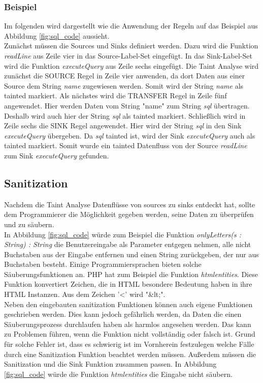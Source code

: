 \documentclass[runningheads]{llncs}
\begin{document}
\subsubsection{Beispiel}
Im folgenden wird dargestellt wie die Anwendung der Regeln auf das Beispiel aus Abbildung \ref{fig:sql_code} aussieht. 
\\Zunächst müssen die Sources und Sinks definiert werden. Dazu wird die Funktion \emph{readLine} aus Zeile vier in das Source-Label-Set eingefügt. In das Sink-Label-Set wird die Funktion \emph{executeQuery} aus Zeile sechs eingefügt. Die Taint Analyse wird zunächst die SOURCE Regel in Zeile vier anwenden, da dort Daten aus einer Source dem String \emph{name} zugewiesen werden. Somit wird der String \emph{name} als tainted markiert. Als nächstes wird die TRANSFER Regel in Zeile fünf angewendet. Hier werden Daten vom String "name" zum String \emph{sql} übertragen. Deshalb wird auch hier der String \emph{sql} als tainted markiert. Schließlich wird in Zeile sechs die SINK Regel angewendet. Hier wird der String \emph{sql} in den Sink \emph{executeQuery} übergeben. Da \emph{sql} tainted ist, wird der Sink \emph{executeQuery} auch als tainted markiert. Somit wurde ein tainted Datenfluss von der Source \emph{readLine} zum Sink \emph{executeQuery} gefunden.

\subsection{Sanitization}
Nachdem die Taint Analyse Datenflüsse von sources zu sinks entdeckt hat, sollte dem Programmierer die Möglichkeit gegeben werden, seine Daten zu überprüfen und zu säubern. 
\\In Abbildung \ref{fig:sql_code} würde zum Beispiel die Funktion \emph{onlyLetters(s : String) : String} die Benutzereingabe als Parameter entgegen nehmen, alle nicht Buchstaben aus der Eingabe entfernen und einen String zurückgeben, der nur aus Buchstaben besteht. Einige Programmiersprachen bieten solche Säuberungsfunktionen an. PHP hat zum Beispiel die Funktion \emph{htmlentities}. Diese Funktion konvertiert Zeichen, die in HTML besondere Bedeutung haben in ihre HTML Instanzen. Aus dem Zeichen '\textless' wird "\&lt;".
\\Neben den eingebauten sanitization Funktionen können auch eigene Funktionen geschrieben werden. Dies kann jedoch gefährlich werden, da Daten die einen Säuberungsprozess durchlaufen haben als harmlos angesehen werden. Das kann zu Problemen führen, wenn die Funktion nicht vollständig oder falsch ist. Grund für solche Fehler ist, dass es schwierig ist im Vornherein festzulegen welche Fälle durch eine Sanitization Funktion beachtet werden müssen. Außerdem müssen die Sanitization und die Sink Funktion zusammen passen. In Abbildung \ref{fig:sql_code} würde die Funktion \emph{htmlentities} die Eingabe nicht säubern. 
\end{document}
